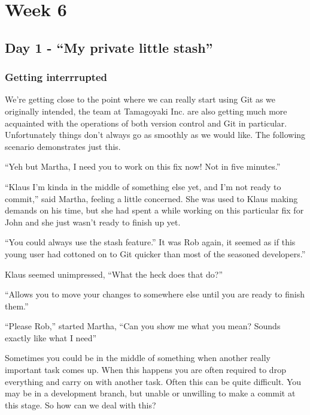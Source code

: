 \cleardoublepage
\chapter{Week 6}

\section{Day 1 - ``My private little stash''}
\subsection{Getting interrrupted}

We're getting close to the point where we can really start using Git as we originally intended, the team at Tamagoyaki Inc. are also getting much more acquainted with the operations of both version control and Git in particular.  Unfortunately things don't always go as smoothly as we would like.  The following scenario demonstrates just this.

\begin{trenches}
``Yeh but Martha, I need you to work on this fix now!  Not in five minutes.''

``Klaus I'm kinda in the middle of something else yet, and I'm not ready to commit,'' said Martha, feeling a little concerned.  She was used to Klaus making demands on his time, but she had spent a while working on this particular fix for John and she just wasn't ready to finish up yet.

``You could always use the stash feature.''  It was Rob again, it seemed as if this young user had cottoned on to Git quicker than most of the seasoned developers.''

Klaus seemed unimpressed, ``What the heck does that do?''

``Allows you to move your changes to somewhere else until you are ready to finish them.''

``Please Rob,'' started Martha, ``Can you show me what you mean?  Sounds exactly like what I need''
\end{trenches}

Sometimes you could be in the middle of something when another really important task comes up.  When this happens you are often required to drop everything and carry on with another task.  Often this can be quite difficult.  You may be in a development branch, but unable or unwilling to make a commit at this stage.  So how can we deal with this?

